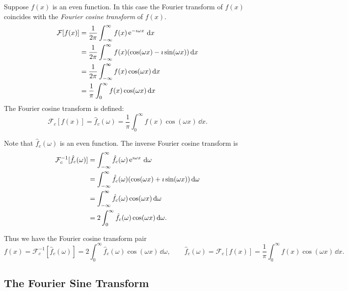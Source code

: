 Suppose $f(x)$ is an even function.  
In this case the Fourier transform of $f(x)$ coincides with the 
\textit{Fourier cosine transform} of $f(x)$.
\begin{align*}
  \mathcal{F}[f(x)]
  &= \frac{1}{2\pi} \int_{-\infty}^\infty f(x) \mathop{\mathrm{e}}\nolimits^{-\imath \omega x}\,\mathrm{d} x 
  \\
  &= \frac{1}{2\pi} \int_{-\infty}^\infty f(x) (\cos(\omega x) - \imath \sin(\omega x)) \,\mathrm{d} x 
  \\
  &= \frac{1}{2\pi} \int_{-\infty}^\infty f(x) \cos(\omega x)\,\mathrm{d} x 
  \\
  &= \frac{1}{\pi} \int_0^\infty f(x) \cos(\omega x)\,\mathrm{d} x
\end{align*}
The Fourier cosine transform is defined:
\[ 
\mathcal{F}_c[f(x)] = \hat{f}_c(\omega) = \frac{1}{\pi} \int_0^\infty f(x) \cos(\omega x)\,\dd x.
\]

Note that $\hat{f}_c(\omega)$ is an even function.  The inverse Fourier cosine 
transform is
\begin{align*}
  \mathcal{F}_c^{-1}[\hat{f}_c(\omega)]
  &= \int_{-\infty}^\infty \hat{f}_c(\omega) \mathop{\mathrm{e}}\nolimits^{\imath \omega x}\,\mathrm{d} \omega 
  \\
  &= \int_{-\infty}^\infty \hat{f}_c(\omega) (\cos(\omega x) + \imath \sin(\omega x))\,\mathrm{d} \omega 
  \\
  &= \int_{-\infty}^\infty \hat{f}_c(\omega) \cos(\omega x)\,\mathrm{d} \omega 
  \\
  &= 2 \int_0^\infty \hat{f}_c(\omega) \cos(\omega x)\,\mathrm{d} \omega.
\end{align*}

Thus we have the Fourier cosine transform pair
\[ 
f(x) = \mathcal{F}_c^{-1}[\hat{f}_c(\omega)] = 2 \int_0^\infty \hat{f}_c(\omega) \cos(\omega x)\,\dd \omega, 
\qquad
\hat{f}_c(\omega) = \mathcal{F}_c[f(x)]=\frac{1}{\pi} \int_0^\infty f(x) \cos(\omega x)\,\dd x.
\]











\subsection{The Fourier Sine Transform}


